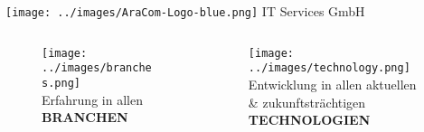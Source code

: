 \documentclass[aspectratio=169]{beamer}
\begin{document}
\begin{frame}{\texttt{[image: ../images/AraCom-Logo-blue.png]} IT Services GmbH}
{\begin{columns}
\begin{column}{0.20\textwidth}
        \begin{figure}
          \centering
          \texttt{[image: ../images/branches.png]}\\
          Erfahrung in allen\\\textbf{BRANCHEN}\newline\newline
        \end{figure}
      \end{column}
      \begin{column}{0.20\textwidth}
        \begin{figure}
          \centering
          \texttt{[image: ../images/technology.png]}\\
          Entwicklung in allen aktuellen \& zukunftsträchtigen\\
          \textbf{TECHNOLOGIEN}
        \end{figure}
      \end{column}
    \end{columns}
  }
\end{frame}
\end{document}

